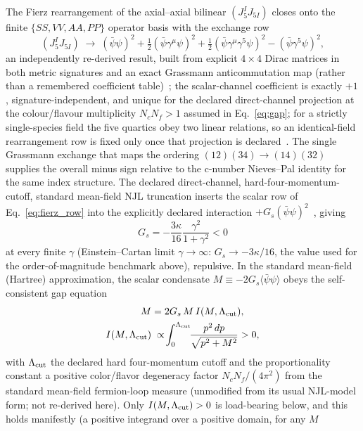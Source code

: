 \documentclass[aps,prd,twocolumn,superscriptaddress,preprintnumbers,nofootinbib,longbibliography,floatfix]{revtex4-2}
\begin{document}
The Fierz rearrangement of the axial--axial bilinear $(J_5^IJ_{5I})$
closes onto the finite $\{SS,VV,AA,PP\}$ operator basis with the
exchange row
\begin{equation}\label{eq:fierz_row}
(J_5^IJ_{5I})\;\to\;(\bar\psi\psi)^2+\tfrac12(\bar\psi\gamma^\mu\psi)^2
+\tfrac12(\bar\psi\gamma^\mu\gamma^5\psi)^2-(\bar\psi\gamma^5\psi)^2,
\end{equation}
an independently re-derived result, built from explicit $4\times4$ Dirac
matrices in both metric signatures and an exact Grassmann anticommutation
map (rather than a remembered coefficient
table)~\cite{FierzAdj2026}; the scalar-channel coefficient is exactly
$+1$, signature-independent, and unique for the declared direct-channel
projection at the colour/flavour multiplicity $N_cN_f>1$ assumed in
Eq.~\eqref{eq:gap}; for a strictly single-species field the five
quartics obey two linear relations, so an identical-field rearrangement
row is fixed only once that projection is declared~\cite{FierzAdj2026}.
The single Grassmann exchange that maps the ordering
$(12)(34)\to(14)(32)$ supplies the overall minus sign relative to the
c-number Nieves--Pal identity for the same index structure. The declared direct-channel,
hard-four-momentum-cutoff, standard mean-field NJL truncation inserts the
scalar row of Eq.~\eqref{eq:fierz_row} into the explicitly declared
interaction $+G_s(\bar\psi\psi)^2$~\cite{Golden2026P1a}, giving
\begin{equation}\label{eq:Gs}
G_s=-\frac{3\kappa}{16}\frac{\gamma^2}{1+\gamma^2}<0
\end{equation}
at every finite $\gamma$ (Einstein--Cartan limit
$\gamma\to\infty$: $G_s\to-3\kappa/16$, the value used for the
order-of-magnitude benchmark above), repulsive. In the standard
mean-field (Hartree) approximation, the scalar condensate
$M\equiv-2G_s\langle\bar\psi\psi\rangle$ obeys the self-consistent
gap equation
\begin{align}\label{eq:gap}
M&=2G_s\,M\,I(M,\Lambda_{\rm cut}),\\
I(M,\Lambda_{\rm cut})&\;\propto\!\int_0^{\Lambda_{\rm cut}}\!\!\frac{p^2\,dp}{\sqrt{p^2+M^2}}>0,\notag
\end{align}
with $\Lambda_{\rm cut}$ the declared hard four-momentum cutoff and the
proportionality constant a positive color/flavor degeneracy factor
$N_cN_f/(4\pi^2)$ from the standard mean-field fermion-loop measure
(unmodified from its usual NJL-model form; not re-derived here). Only
$I(M,\Lambda_{\rm cut})>0$ is load-bearing below, and this holds
manifestly (a positive integrand over a positive domain, for any $M$
\end{document}
